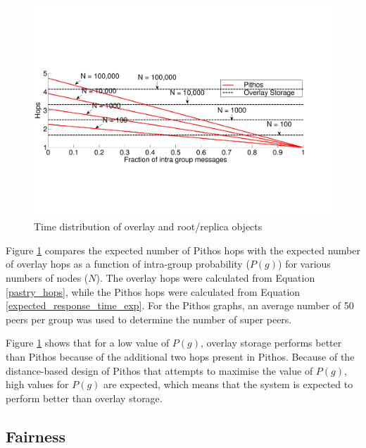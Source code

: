 \documentclass[10pt,a4paper,conference]{IEEEtran}
\begin{document}
\begin{figure}[htbp]
 \centering
 \includegraphics[clip=true, viewport=0cm 5cm 27cm 14.5cm, width=\columnwidth]{Hops_vsGroupFrac_4n}
 \caption{Time distribution of overlay and root/replica objects}
 \label{fig_hop_compare}
\end{figure}
%
Figure \ref{fig_hop_compare} compares the expected number of Pithos hops with the expected number of overlay hops as a function of intra-group
probability ($P(g)$) for various numbers of nodes ($N$). The overlay hops were calculated from Equation \eqref{pastry_hops}, while the Pithos hops
were calculated from Equation \eqref{expected_response_time_exp}. For the Pithos graphs, an average number of 50 peers per group was used to
determine the number of super peers.

Figure \ref{fig_hop_compare} shows that for a low value of $P(g)$, overlay storage performs better than Pithos because of the additional two hops
present in Pithos. Because of the distance-based design of Pithos that attempts to maximise the value of $P(g)$, high values for $P(g)$ are expected,
which means that the system is expected to perform better than overlay storage.

\subsection{Fairness}
\end{document}
